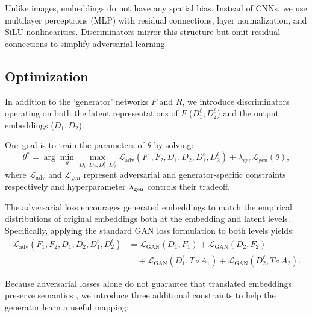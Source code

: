 Unlike images, embeddings do not have any spatial bias.  Instead of CNNs, we use multilayer perceptrons (MLP) with residual connections, layer normalization, and SiLU nonlinearities.  Discriminators mirror this structure but omit residual connections to simplify adversarial learning.


\subsection{Optimization}
\label{subsec:method-opt}


In addition to the `generator' networks $F$ and $R$, we introduce discriminators operating on both the latent representations of $F$ ($D_{1}^{\ell}, D_{2}^{\ell}$) and the output embeddings ($D_1, D_2$).

Our goal is to train the parameters of $\theta$ by solving:
\begin{equation}\label{eq:base_objective}
    \theta^* = \arg \min_{\theta} \max_{D_1, D_2, D_{1}^{\ell}, D_{2}^{\ell}} \mathcal{L}_{\text{adv}}(F_1,F_2,D_1,D_2,D_{1}^{\ell},D_{2}^{\ell}) + \lambda_{\text{gen}} \mathcal{L}_{\text{gen}}(\theta),
\end{equation}
where $\mathcal{L}_{\text{adv}}$ and $\mathcal{L}_{\text{gen}}$ represent adversarial and generator-specific constraints respectively and hyperparameter $\lambda_{\rm gen}$ controls their tradeoff.

The adversarial loss encourages generated embeddings to match the empirical distributions of original embeddings both at the embedding and latent levels. Specifically, applying the standard GAN loss formulation \citep{10.1145/3422622} to both levels yields:
\begin{align*}
    \mathcal{L}_{\text{adv}}(F_1,F_2,D_1,D_2,D_{1}^{\ell},D_{2}^{\ell}) 
    &= \mathcal{L}_{\text{GAN}}(D_1, F_1) + \mathcal{L}_{\text{GAN}}(D_2, F_2) \\
    &\quad + \mathcal{L}_{\text{GAN}}(D_{1}^{\ell}, T \circ A_1) + \mathcal{L}_{\text{GAN}}(D_{2}^{\ell},  T \circ A_2).
\end{align*}


Because adversarial losses alone do not guarantee that translated embeddings preserve semantics \citep{zhu2020unpairedimagetoimagetranslationusing}, we introduce three additional constraints to help the generator learn a useful mapping:

